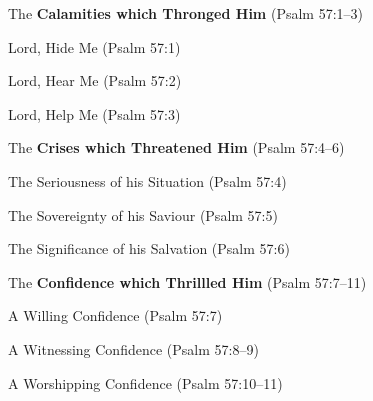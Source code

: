 \begin{compactenum}[I.][3]
    \item The \textbf{Calamities which Thronged Him}  (Psalm 57:1--3)
	\begin{compactenum}[A.][3]
		\item Lord, Hide Me  (Psalm 57:1)
		\item Lord, Hear Me  (Psalm 57:2)
		\item Lord, Help Me  (Psalm 57:3)
	\end{compactenum}
    \item The \textbf{Crises which Threatened Him}  (Psalm 57:4--6)
	\begin{compactenum}[A.][3]
		\item The Seriousness of his Situation  (Psalm 57:4)
		\item The Sovereignty of his Saviour  (Psalm 57:5)
		\item The Significance of his Salvation  (Psalm 57:6)
	\end{compactenum}
    \item The \textbf{Confidence which Thrillled Him}  (Psalm 57:7--11)
	\begin{compactenum}[A.][3]
		\item A Willing Confidence  (Psalm 57:7)
		\item A Witnessing Confidence  (Psalm 57:8--9)
		\item A Worshipping Confidence  (Psalm 57:10--11)
	\end{compactenum}
\end{compactenum}